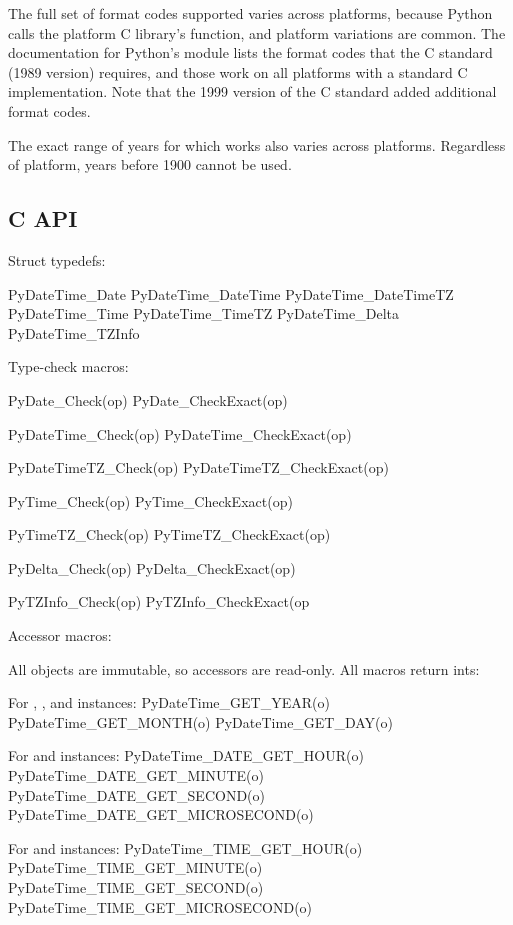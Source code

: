 The full set of format codes supported varies across platforms,
because Python calls the platform C library's 
function, and platform variations are common.  The documentation for
Python's  module lists the format codes that the C
standard (1989 version) requires, and those work on all platforms
with a standard C implementation.  Note that the 1999 version of the
C standard added additional format codes.

The exact range of years for which  works also
varies across platforms.  Regardless of platform, years before 1900
cannot be used.


\subsection{C API}

Struct typedefs:

    PyDateTime_Date
    PyDateTime_DateTime
    PyDateTime_DateTimeTZ
    PyDateTime_Time
    PyDateTime_TimeTZ
    PyDateTime_Delta
    PyDateTime_TZInfo

Type-check macros:

    PyDate_Check(op)
    PyDate_CheckExact(op)

    PyDateTime_Check(op)
    PyDateTime_CheckExact(op)

    PyDateTimeTZ_Check(op)
    PyDateTimeTZ_CheckExact(op)

    PyTime_Check(op)
    PyTime_CheckExact(op)

    PyTimeTZ_Check(op)
    PyTimeTZ_CheckExact(op)

    PyDelta_Check(op)
    PyDelta_CheckExact(op)

    PyTZInfo_Check(op)
    PyTZInfo_CheckExact(op

Accessor macros:

All objects are immutable, so accessors are read-only.  All macros
return ints:

    For , , and  instances:
        PyDateTime_GET_YEAR(o)
        PyDateTime_GET_MONTH(o)
        PyDateTime_GET_DAY(o)

    For  and  instances:
        PyDateTime_DATE_GET_HOUR(o)
        PyDateTime_DATE_GET_MINUTE(o)
        PyDateTime_DATE_GET_SECOND(o)
        PyDateTime_DATE_GET_MICROSECOND(o)

    For  and  instances:
        PyDateTime_TIME_GET_HOUR(o)
        PyDateTime_TIME_GET_MINUTE(o)
        PyDateTime_TIME_GET_SECOND(o)
        PyDateTime_TIME_GET_MICROSECOND(o)
